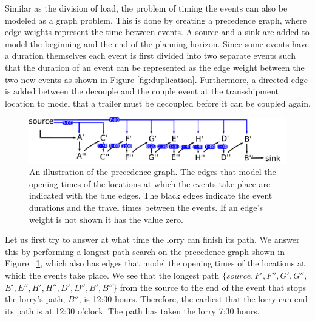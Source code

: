 Similar as the division of load, the problem of timing the events can also be modeled as a graph problem. 
This is done by creating a precedence graph, where edge weights represent the time between events. 
A source and a sink are added to model the beginning and the end of the planning horizon. 
Since some events have a duration themselves each event is first divided into two separate events such that the duration of an event can be represented as the edge weight between the two new events as shown in Figure \ref{fig:duplication}. 
Furthermore, a directed edge is added between the decouple and the couple event at the transshipment location to model that a trailer must be decoupled before it can be coupled again. 
\\





\begin{figure}[!h]
  \centering
    \includegraphics[width=1.0\textwidth]{img/forward_intro_tt.pdf}
  \caption{An illustration of the precedence graph. 
  The edges that model the opening times of the locations at which the events take place are indicated with the blue edges. 
  The black edges indicate the event durations and the travel times between the events. If an edge's weight is not shown it has the value zero. }
  \label{fig:longest_path}
\end{figure}

Let us first try to answer at what time the lorry can finish its path. 
We answer this by performing a longest path search on the precedence graph shown in Figure ~\ref{fig:longest_path}, which also has edges that model the opening times of the locations at which the events take place. 
We see that the longest path $\{ source, F', F'', G', G'', $ $ E', E'',  H', H'', D', D'', B', B'' \} $ from the source to the end of the event that stops the lorry's path, $B''$, is 12:30 hours.
Therefore, the earliest that the lorry can end its path is at 12:30 o'clock.
The path has taken the lorry 7:30 hours. \\

